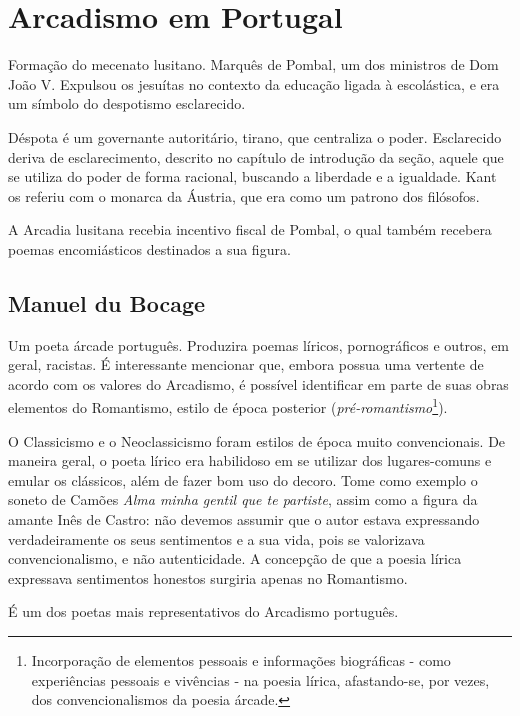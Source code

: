
\chapter{Arcadismo em Portugal}

Formação do mecenato lusitano. Marquês de Pombal, um dos ministros de Dom João V. Expulsou os jesuítas no contexto da educação ligada à escolástica, e era um símbolo do despotismo esclarecido.

Déspota é um governante autoritário, tirano, que centraliza o poder. Esclarecido deriva de esclarecimento, descrito no capítulo de introdução da seção, aquele que se utiliza do poder de forma racional, buscando a liberdade e a igualdade. Kant os referiu com o monarca da Áustria, que era como um patrono dos filósofos.

A Arcadia lusitana recebia incentivo fiscal de Pombal, o qual também recebera poemas encomiásticos destinados a sua figura.

\section{Manuel du Bocage}

Um poeta árcade português. Produzira poemas líricos, pornográficos e outros, em geral, racistas. É interessante mencionar que, embora possua uma vertente de acordo com os valores do Arcadismo, é possível identificar em parte de suas obras elementos do Romantismo, estilo de época posterior (\textit{pré-romantismo}\footnote{Incorporação de elementos pessoais e informações biográficas - como experiências pessoais e vivências - na poesia lírica, afastando-se, por vezes, dos convencionalismos da poesia árcade.}).

O Classicismo e o Neoclassicismo foram estilos de época muito convencionais. De maneira geral, o poeta lírico era habilidoso em se utilizar dos lugares-comuns e emular os clássicos, além de fazer bom uso do decoro. Tome como exemplo o soneto de Camões \textit{Alma minha gentil que te partiste}, assim como a figura da amante Inês de Castro: não devemos assumir que o autor estava expressando verdadeiramente os seus sentimentos e a sua vida, pois se valorizava convencionalismo, e não autenticidade. A concepção de que a poesia lírica expressava sentimentos honestos surgiria apenas no Romantismo.

É um dos poetas mais representativos do Arcadismo português.

